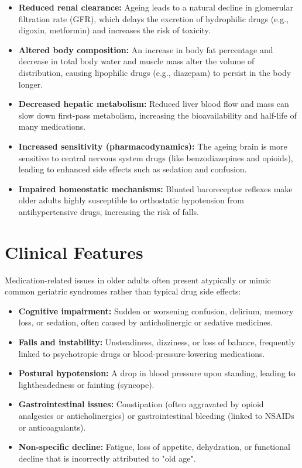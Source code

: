 \begin{itemize}
    \item \textbf{Reduced renal clearance:} Ageing leads to a natural decline in glomerular filtration rate (GFR), which delays the excretion of hydrophilic drugs (e.g., digoxin, metformin) and increases the risk of toxicity.
    \item \textbf{Altered body composition:} An increase in body fat percentage and decrease in total body water and muscle mass alter the volume of distribution, causing lipophilic drugs (e.g., diazepam) to persist in the body longer.
    \item \textbf{Decreased hepatic metabolism:} Reduced liver blood flow and mass can slow down first-pass metabolism, increasing the bioavailability and half-life of many medications.
    \item \textbf{Increased sensitivity (pharmacodynamics):} The ageing brain is more sensitive to central nervous system drugs (like benzodiazepines and opioids), leading to enhanced side effects such as sedation and confusion.
    \item \textbf{Impaired homeostatic mechanisms:} Blunted baroreceptor reflexes make older adults highly susceptible to orthostatic hypotension from antihypertensive drugs, increasing the risk of falls.
\end{itemize}

\section*{Clinical Features}
Medication-related issues in older adults often present atypically or mimic common geriatric syndromes rather than typical drug side effects:

\begin{itemize}
    \item \textbf{Cognitive impairment:} Sudden or worsening confusion, delirium, memory loss, or sedation, often caused by anticholinergic or sedative medicines.
    \item \textbf{Falls and instability:} Unsteadiness, dizziness, or loss of balance, frequently linked to psychotropic drugs or blood-pressure-lowering medications.
    \item \textbf{Postural hypotension:} A drop in blood pressure upon standing, leading to lightheadedness or fainting (syncope).
    \item \textbf{Gastrointestinal issues:} Constipation (often aggravated by opioid analgesics or anticholinergics) or gastrointestinal bleeding (linked to NSAIDs or anticoagulants).
    \item \textbf{Non-specific decline:} Fatigue, loss of appetite, dehydration, or functional decline that is incorrectly attributed to "old age".
\end{itemize}

